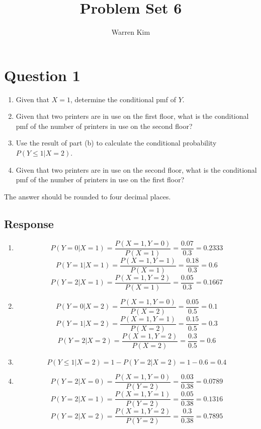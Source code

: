 \documentclass[13pt]{article}
\title{Problem Set 6}
\author{Warren Kim}
\begin{document}
\maketitle

\newpage
\section*{Question 1}
\begin{enumerate}[label=(\alph*)]
\item Given that $X = 1$, determine the conditional pmf of $Y$.
\item Given that two printers are in use on the first floor, what is
  the conditional pmf of the number of printers in use on the second
  floor?
\item Use the result of part (b) to calculate the conditional
  probability $P(Y \leq 1 | X = 2)$.
\item Given that two printers are in use on the second floor, what is
  the conditional pmf of the number of printers in use on the first
  floor?
\end{enumerate}
The answer should be rounded to four decimal places.

\subsection*{Response}
\begin{enumerate}[label=(\alph*)]
\item
  \[P(Y = 0 | X = 1) = \frac{P(X = 1, Y = 0)}{P(X = 1)} =
    \frac{0.07}{0.3} = 0.2333\]
  \[P(Y = 1 | X = 1) = \frac{P(X = 1, Y = 1)}{P(X = 1)} =
    \frac{0.18}{0.3} = 0.6\]
  \[P(Y = 2 | X = 1) = \frac{P(X = 1, Y = 2)}{P(X = 1)} =
    \frac{0.05}{0.3} = 0.1667\]
  
\item
  \[P(Y = 0 | X = 2) = \frac{P(X = 1, Y = 0)}{P(X = 2)} =
    \frac{0.05}{0.5} = 0.1\]
  \[P(Y = 1 | X = 2) = \frac{P(X = 1, Y = 1)}{P(X = 2)} =
    \frac{0.15}{0.5} = 0.3\]
  \[P(Y = 2 | X = 2) = \frac{P(X = 1, Y = 2)}{P(X = 2)} =
    \frac{0.3}{0.5} = 0.6\]

\item
  \[P(Y \leq 1 | X = 2) = 1 - P(Y = 2 | X = 2) = 1 - 0.6 = 0.4\]
  
\item
  \[P(Y = 2 | X = 0) = \frac{P(X = 1, Y = 0)}{P(Y = 2)} =
    \frac{0.03}{0.38} = 0.0789\]
  \[P(Y = 2 | X = 1) = \frac{P(X = 1, Y = 1)}{P(Y = 2)} =
    \frac{0.05}{0.38} = 0.1316\]
  \[P(Y = 2 | X = 2) = \frac{P(X = 1, Y = 2)}{P(Y = 2)} =
    \frac{0.3}{0.38} = 0.7895\]
\end{enumerate}
\end{document}
